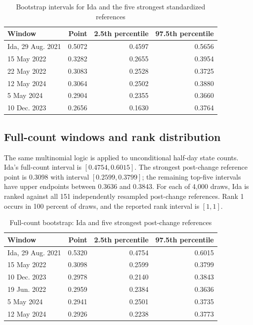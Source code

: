 \documentclass[11pt]{article}
\begin{document}
\begin{table}[t]
\centering
\caption{Bootstrap intervals for Ida and the five strongest standardized references}
\label{tab:bootstd}
\begin{tabular}{@{}lrrr@{}}
\toprule
Window & Point & 2.5th percentile & 97.5th percentile \\
\midrule
Ida, 29 Aug. 2021 & 0.5072 & 0.4597 & 0.5656 \\
15 May 2022 & 0.3282 & 0.2655 & 0.3954 \\
22 May 2022 & 0.3083 & 0.2528 & 0.3725 \\
12 May 2024 & 0.3064 & 0.2502 & 0.3880 \\
5 May 2024 & 0.2904 & 0.2355 & 0.3660 \\
10 Dec. 2023 & 0.2656 & 0.1630 & 0.3764 \\
\bottomrule
\end{tabular}
\end{table}

\subsection{Full-count windows and rank distribution}

The same multinomial logic is applied to unconditional half-day state counts. Ida's full-count interval is $[0.4754,0.6015]$. The strongest post-change reference point is 0.3098 with interval $[0.2599,0.3799]$; the remaining top-five intervals have upper endpoints between 0.3636 and 0.3843. For each of 4,000 draws, Ida is ranked against all 151 independently resampled post-change references. Rank 1 occurs in 100 percent of draws, and the reported rank interval is $[1,1]$.

\begin{table}[t]
\centering
\caption{Full-count bootstrap: Ida and five strongest post-change references}
\label{tab:bootraw}
\begin{tabular}{@{}lrrr@{}}
\toprule
Window & Point & 2.5th percentile & 97.5th percentile \\
\midrule
Ida, 29 Aug. 2021 & 0.5320 & 0.4754 & 0.6015 \\
15 May 2022 & 0.3098 & 0.2599 & 0.3799 \\
10 Dec. 2023 & 0.2978 & 0.2140 & 0.3843 \\
19 Jun. 2022 & 0.2959 & 0.2384 & 0.3636 \\
5 May 2024 & 0.2941 & 0.2501 & 0.3735 \\
12 May 2024 & 0.2926 & 0.2238 & 0.3773 \\
\bottomrule
\end{tabular}
\end{table}
\end{document}
